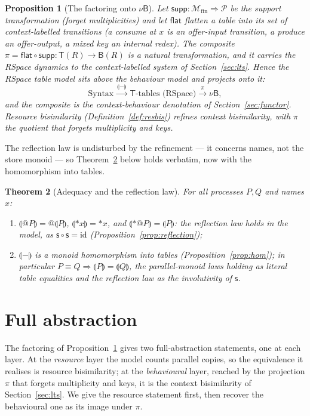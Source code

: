 \documentclass[11pt]{article}
\makeatletter
\newcommand{\swp}{\mathsf{s}}                  %
\newcommand{\drp}[1]{{\ast}#1}
\newcommand{\quo}[1]{@#1}
\newcommand{\B}{\mathsf{B}}
\newcommand{\sem}[1]{\llparenthesis #1\rrparenthesis}   %
\newcommand{\scong}{\equiv}
\newcommand{\Tab}{\mathsf{T}}                  %
\newcommand{\Mfin}{\mathcal{M}_{\mathrm{fin}}} %
\newcommand{\supmap}{\mathsf{supp}}            %
\theoremstyle{plain}
\newtheorem{theorem}{Theorem}
\newtheorem{proposition}[theorem]{Proposition}
\theoremstyle{definition}
\makeatother
\begin{document}
\begin{proposition}[The factoring onto $\nu\B$]\label{prop:factor}
Let $\supmap\colon\Mfin\Rightarrow\mathcal P$ be the support transformation
(forget multiplicities) and let $\mathsf{flat}$ flatten a table into its set of
context-labelled transitions (a consume at $x$ is an offer-input transition, a
produce an offer-output, a mixed key an internal redex). The composite
$\pi=\mathsf{flat}\circ\supmap\colon\Tab(R)\to\B(R)$ is a natural transformation,
and it carries the RSpace dynamics to the context-labelled system of
Section~\ref{sec:lts}. Hence the RSpace table model sits \emph{above} the
behaviour model and projects onto it:
\[
  \text{Syntax} \xrightarrow{\ \sem{-}\ } \Tab\text{-tables (RSpace)}
                \xrightarrow{\ \pi\ } \nu\B ,
\]
and the composite is the context-behaviour denotation of
Section~\ref{sec:functor}. Resource bisimilarity (Definition~\ref{def:resbis})
refines context bisimilarity, with $\pi$ the quotient that forgets multiplicity and
keys.
\end{proposition}

The reflection law is undisturbed by the refinement --- it concerns names, not the
store monoid --- so Theorem~\ref{thm:adequacy} below holds verbatim, now with the
homomorphism into tables.

\begin{theorem}[Adequacy and the reflection law]\label{thm:adequacy}
For all processes $P,Q$ and names $x$:
\begin{enumerate}[label=\textup{(\roman*)},nosep]
  \item $\sem{\quo P}=\quo{\sem P}$, $\sem{\drp x}=\drp x$, and
        $\sem{\drp{\quo P}}=\sem P$: the reflection law holds in the model, as
        $\swp\circ\swp=\mathrm{id}$ (Proposition~\ref{prop:reflection});
  \item $\sem{-}$ is a monoid homomorphism into tables
        (Proposition~\ref{prop:hom}); in particular $P\scong Q\Rightarrow\sem P=\sem Q$,
        the parallel-monoid laws holding as literal table equalities and the
        reflection law as the involutivity of $\swp$.
\end{enumerate}
\end{theorem}

\section{Full abstraction}\label{sec:fa}

The factoring of Proposition~\ref{prop:factor} gives two full-abstraction
statements, one at each layer. At the \emph{resource} layer the model counts
parallel copies, so the equivalence it realises is resource bisimilarity; at the
\emph{behavioural} layer, reached by the projection $\pi$ that forgets multiplicity
and keys, it is the context bisimilarity of Section~\ref{sec:lts}. We give the
resource statement first, then recover the behavioural one as its image under
$\pi$.
\end{document}
